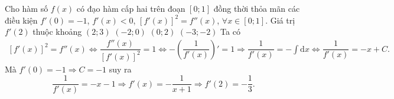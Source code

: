 \begin{ex}%
	Cho hàm số $ f(x)$ có đạo hàm cấp hai trên đoạn $\left[0;1\right]$ đồng thời thỏa mãn các điều kiện $f'(0)=-1$, $f'(x)<0$, $\left[f'(x)\right]^2=f''(x)$, $\forall x\in\left[0;1\right]$. Giá trị $ f'(2)$ thuộc khoảng
	\choice
	{$(2;3)$}
	{\True $(-2;0)$}
	{$(0;2)$}
	{$(-3;-2)$}
	\loigiai
	{
		Ta có
		\begin{align*}
		\left[f'(x)\right]^2=f''(x) \Leftrightarrow\dfrac{f''(x)}{\left[f'(x)\right]^2}=1\Leftrightarrow-\left(\dfrac{1}{f'(x)}\right)'=1\Rightarrow\dfrac{1}{f'(x)}=-\displaystyle\int{\mathrm{d} x} \Leftrightarrow\dfrac{1}{f'(x)}=-x+C.
		\end{align*}
		Mà $f'(0)=-1\Rightarrow C=-1$ suy ra
		$$\dfrac{1}{f'(x)}=-x-1\Rightarrow f'(x)=-\dfrac{1}{x+1} \Rightarrow{f}'(2)=-\dfrac{1}{3}.$$
		}
\end{ex}

